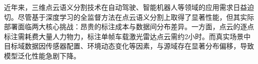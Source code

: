 





近年来，三维点云语义分割技术在自动驾驶、智能机器人等领域的应用需求日益迫切。尽管基于深度学习的全监督方法在点云语义分割上取得了显著性能，但其实际部署面临两大核心挑战：昂贵的标注成本与数据间分布差异。一方面，点云的逐点标注需耗费大量人力物力，标注单帧车载激光雷达点云需约2小时。而真实场景中目标域数据因传感器配置、环境动态变化等因素，与源域存在显著分布偏移，导致模型泛化性能急剧下降。  

